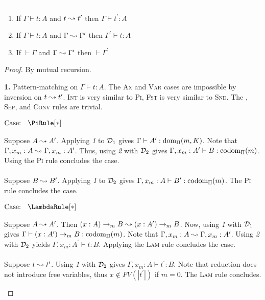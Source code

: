 \begin{lemma}
    \label{lem:2:preservation_no_type_step}
    \textcolor{white}{\_}
    \begin{enumerate}
        \item If $\Gamma \vdash t : A$ and $t \leadsto t^\prime$ then $\Gamma \vdash t^\prime : A$
        \item If $\Gamma \vdash t : A$ and $\Gamma \leadsto \Gamma^\prime$ then $\Gamma^\prime \vdash t : A$
        \item If $\vdash \Gamma$ and $\Gamma \leadsto \Gamma^\prime$ then $\vdash \Gamma^\prime$
    \end{enumerate}
\end{lemma}
\begin{proof}
    By mutual recursion.

    \noindent \textbf{1.} Pattern-matching on $\Gamma \vdash t : A$.
    The \textsc{Ax} and \textsc{Var} cases are impossible by inversion on $t \leadsto t^\prime$.
    \textsc{Int} is very similar to \textsc{Pi}, \textsc{Fst} is very similar to \textsc{Snd}.
    The , \textsc{Sep}, and \textsc{Conv} rules are trivial.

    $\text{Case: }\begin{array}{c} \PiRule[*] \end{array}$
    \begin{proofcase}
        Suppose $A \leadsto A^\prime$.
        Applying \textit{1} to $\mathcal{D}_{1}$ gives $\Gamma \vdash A^\prime : \textnormal{dom}_\Pi(m, K)$.
        Note that $\Gamma, x_m : A \leadsto \Gamma, x_m : A^\prime$.
        Thus, using \textit{2} with $\mathcal{D}_{2}$ gives $\Gamma, x_m : A^\prime \vdash B : \textnormal{codom}_\Pi(m)$.
        Using the \textsc{Pi} rule concludes the case.
        \\ \\
        Suppose $B \leadsto B^\prime$.
        Applying \textit{1} to $\mathcal{D}_{2}$ gives $\Gamma, x_m : A \vdash B^\prime : \textnormal{codom}_\Pi(m)$.
        The \textsc{Pi} rule concludes the case.
    \end{proofcase}

    $\text{Case: }\begin{array}{c} \LambdaRule[*] \end{array}$
    \begin{proofcase}
        Suppose $A \leadsto A^\prime$.
        Then $(x : A) \to_m B \leadsto (x : A^\prime) \to_m B$.
        Now, using \textit{1} with $\mathcal{D}_{1}$ gives $\Gamma \vdash (x : A^\prime) \to_m B : \textnormal{codom}_\Pi(m)$.
        Note that $\Gamma, x_m : A \leadsto \Gamma, x_m : A^\prime$.
        Using \textit{2} with $\mathcal{D}_{2}$ yields $\Gamma, x_m : A^\prime \vdash t : B$.
        Applying the \textsc{Lam} rule concludes the case.
        \\ \\
        Suppose $t \leadsto t^\prime$.
        Using \textit{1} with $\mathcal{D}_{2}$ gives $\Gamma, x_m : A \vdash t^\prime : B$.
        Note that reduction does not introduce free variables, thus $x \notin FV(|t^\prime|)$ if $m = 0$.
        The \textsc{Lam} rule concludes.
    \end{proofcase}


\end{proof}
